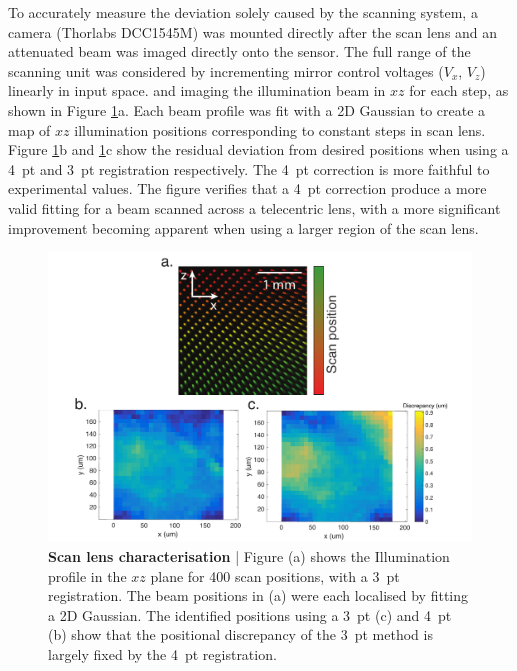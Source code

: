 To accurately measure the deviation solely caused by the scanning system, a camera (Thorlabs DCC1545M) was mounted directly after the scan lens and an attenuated beam was imaged directly onto the sensor.
The full range of the scanning unit was considered by incrementing mirror control voltages ($V_x$, $V_z$) linearly in input space.
and imaging the illumination beam in $xz$ for each step,
as shown in Figure \ref{fig:2}a.
Each beam profile was fit with a 2D Gaussian to create a map of $xz$ illumination positions corresponding to constant steps in scan lens.
Figure \ref{fig:2}b and \ref{fig:2}c show the residual deviation from desired positions when using a 4~pt and 3~pt registration respectively. The 4~pt correction is more faithful to experimental values.
The figure verifies that a 4~pt correction %
produce a more valid fitting for a beam scanned across a telecentric lens, with a more significant improvement becoming apparent when using a larger region of the scan lens.

\begin{figure}
  \includegraphics[width=\columnwidth]{figure2}
  \caption{\textbf{Scan lens characterisation} | Figure (a) shows the Illumination profile in the $xz$ plane for 400 scan positions, %
  with a 3~pt registration.
  The beam positions in %
  (a) were each localised by fitting a 2D Gaussian. The identified positions %
  using a 3~pt (c) and 4~pt (b) %
  show that the positional discrepancy of the 3~pt method is largely fixed by the 4~pt registration.
  }
  \label{fig:2}
\end{figure}

